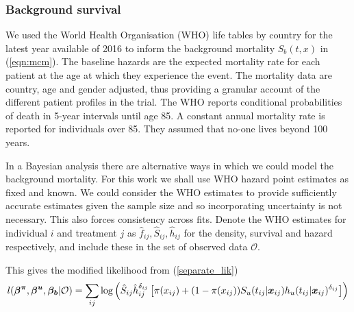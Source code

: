 \documentclass[AMA,STIX1COL]{WileyNJD-v2}
\begin{document}


\subsubsection{Background survival}
We used the World Health Organisation (WHO) life tables by country for the latest year available of 2016
\cite{wholifetables} to inform the background mortality $S_b(t, x)$ in (\ref{eqn:mcm}).
The baseline hazards are the expected mortality rate for each
patient at the age at which they experience the event. The mortality
data are country, age and gender adjusted, thus providing a granular account of
the different patient profiles in the trial.
The WHO reports conditional probabilities of death in 5-year intervals until age 85.
A constant annual mortality rate is reported for individuals over 85.
They assumed that no-one lives beyond 100 years.

In a Bayesian analysis there are alternative ways in which we could
model the background mortality.
For this work we shall use WHO hazard point estimates as fixed and known.
We could consider the WHO estimates to provide sufficiently accurate estimates
given the sample size and so incorporating uncertainty is not necessary.
This also forces consistency across fits.
Denote the WHO estimates for individual $i$ and treatment $j$ as
$\hat{f}_{ij}, \hat{S}_{ij}, \hat{h}_{ij}$ for the density,
survival and hazard respectively, and include these in the set of observed
data $\mathcal{O}$.

This gives the modified likelihood from (\ref{separate_lik})
\begin{equation*}
\mathnormal{l}(\boldsymbol{\beta^{\pi}}, \boldsymbol{\beta^{u}}, \boldsymbol{\beta_b} | \mathcal{O}) =
\sum_{ij} \log\left( \hat{S}_{ij} \hat{h}_{ij}^{\delta_{ij}} \left[\pi(x_{ij}) +
   (1 - \pi(x_{ij})) S_u(t_{ij} | \boldsymbol{x}_{ij}) h_u(t_{ij} | \boldsymbol{x}_{ij})^{\delta_{ij}} \right] \right)
\end{equation*}
\end{document}
